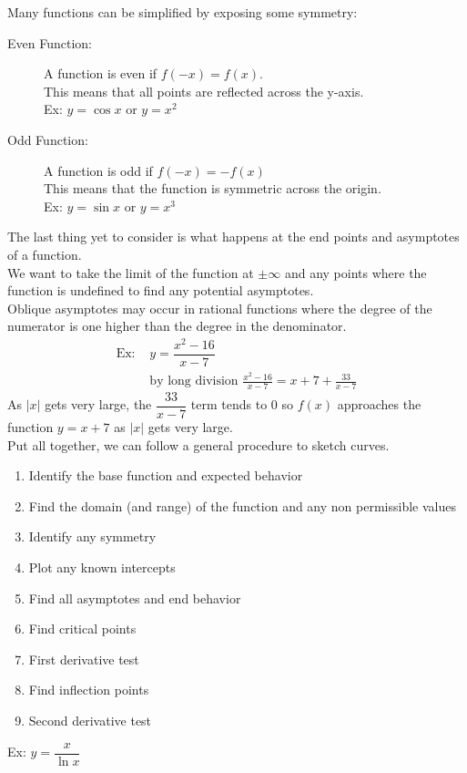 Many functions can be simplified by exposing some symmetry:
\begin{description}
    \item[Even Function:] A function is even if $f(-x)=f(x)$.\\
    This means that all points are reflected across the y-axis.\\
    Ex: $y=\cos x$ or $y=x^2$
    \item[Odd Function:] A function is odd if $f(-x)=-f(x)$\\
    This means that the function is symmetric across the origin.\\
    Ex: $y=\sin x$ or $y=x^3$
\end{description}
The last thing yet to consider is what happens at the end points and asymptotes of a function.\\
We want to take the limit of the function at $\pm\infty$ and any points where the function is undefined to find any potential asymptotes.\\
Oblique asymptotes may occur in rational functions where the degree of the numerator is one higher than the degree in the denominator.
\begin{align*}
    \text{Ex: }&y=\dfrac{x^2-16}{x-7}\\
    &\text{by long division }\frac{x^2-16}{x-7}=x+7+\frac{33}{x-7}
\end{align*}
As $|x|$ gets very large, the $\dfrac{33}{x-7}$ term tends to 0 so $f(x)$ approaches the function $y=x+7$ as $|x|$ gets very large.\\
Put all together, we can follow a general procedure to sketch curves.
\begin{enumerate}
    \item Identify the base function and expected behavior
    \item Find the domain (and range) of the function and any non permissible values
    \item Identify any symmetry
    \item Plot any known intercepts
    \item Find all asymptotes and end behavior
    \item Find critical points
    \item First derivative test
    \item Find inflection points
    \item Second derivative test
\end{enumerate}
Ex: $y=\dfrac{x}{\ln x}$\\
